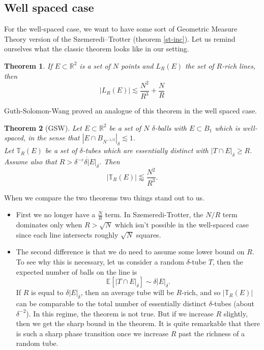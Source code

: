 \documentclass[12pt]{amsart}
\newtheorem{theorem}{Theorem}[section]
\newcommand{\RR}{\mathbb{R}}
\newcommand{\TT}{\mathbb{T}}
\begin{document}
\subsection{Well spaced case}
For the well-spaced case, we want to have some sort of Geometric Measure Theory version of the Szemeredi–Trotter (theorem \ref{st-inc}). Let us remind ourselves what the classic theorem looks like in our setting. 
\begin{theorem}
  If $E \subset \RR^2$ is a set of $N$ points and $L_{R} (E)$ the set of $R$-rich lines, then
$$
    |L_{R} (E)| \lesssim \frac{N^2}{R^3} + \frac{N}{R}
  $$
\end{theorem}

Guth-Solomon-Wang proved an analogue of this theorem in the well spaced case.

\begin{theorem}[GSW]
  Let $E \subset \RR^2$ be a set of $N$ $\delta$-balls with $E \subset B_1$ which is well-spaced, in the sense that $|E \cap B_{N^{-1/2}}|_\delta \lesssim 1$. \\
  Let $\TT_{R}(E)$ be a set of $\delta$-tubes which are essentially distinct with $|T \cap E|_\delta \geq R$. \\
  Assume also that $R > \delta^{-\varepsilon} \delta \dot |E|_\delta$. Then
  \[
  |\TT_{R} (E)| \lessapprox \frac{N^2}{R^3}.
  \]
\end{theorem}


When we compare the two theorems two things stand out to us.
\begin{itemize}
  \item First we no longer have a $\frac{N}{R}$ term.   In Szemeredi-Trotter, the $N/R$ term  dominates only when $R > \sqrt{N}$ which isn't possible in the well-spaced case since each line intersects roughly $\sqrt {N}$ squares.
  \item The second difference is that we do need to assume some lower bound on $R$. To see why this is necessary, let us consider a random $\delta$-tube $T$, then the expected number of balls on the line is
    \[
      \mathbb{E}[|T \cap E|_\delta] \sim \delta |E|_\delta.
    \]
    If $R$ is equal to $\delta |E|_\delta$,  then an average tube will be $R$-rich,  and so $|\TT_R(E)|$ can be comparable to the total number of essentially distinct $\delta$-tubes (about $\delta^{-2}$).   In this regime,  the theorem is not true.   But if we increase $R$ slightly,  then we get the sharp bound in the theorem.  
    It is  quite remarkable that there is such a sharp phase transition once we increase $R$ past the richness of a random tube.
\end{itemize}
\end{document}
